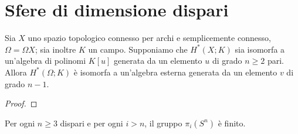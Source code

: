 \section{Sfere di dimensione dispari}
\begin{lemma}
Sia $X$ uno spazio topologico connesso per archi e semplicemente connesso, $\Omega=\Omega X$; sia inoltre $K$ un campo. Supponiamo che $H^*(X;K)$ sia isomorfa a un'algebra di polinomi $K[u]$ generata da un elemento $u$ di grado $n\ge 2$ pari. Allora $H^*(\Omega;K)$ è isomorfa a un'algebra esterna generata da un elemento $v$ di grado $n-1$.
\end{lemma}
\begin{proof}

\end{proof}
\begin{proposition}
Per ogni $n\ge 3$ dispari e per ogni $i>n$, il gruppo $\pi_i(S^n)$ è finito.
\end{proposition}